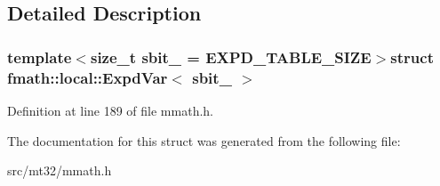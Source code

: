 \subsection{Detailed Description}
\subsubsection*{template$<$size\-\_\-t sbit\-\_\- = E\-X\-P\-D\-\_\-\-T\-A\-B\-L\-E\-\_\-\-S\-I\-Z\-E$>$struct fmath\-::local\-::\-Expd\-Var$<$ sbit\-\_\- $>$}



Definition at line 189 of file mmath.\-h.



The documentation for this struct was generated from the following file\-:\begin{DoxyCompactItemize}
\item 
src/mt32/mmath.\-h\end{DoxyCompactItemize}
